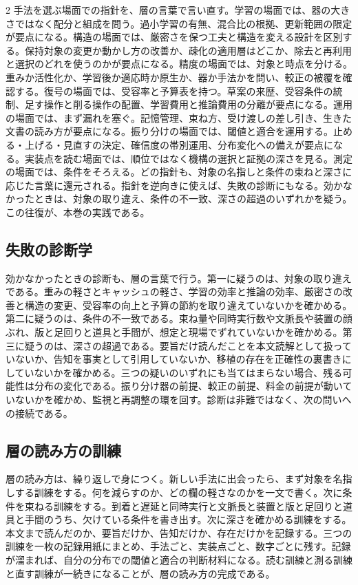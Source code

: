 \documentclass[lualatex,a4paper,10pt]{jlreq}
\begin{document}
\begin{multicols}{2}
手法を選ぶ場面での指針を、層の言葉で言い直す。学習の場面では、器の大きさではなく配分と組成を問う。過小学習の有無、混合比の根拠、更新範囲の限定が要点になる。構造の場面では、厳密さを保つ工夫と構造を変える設計を区別する。保持対象の変更か動かし方の改善か、疎化の適用層はどこか、除去と再利用と選択のどれを使うのかが要点になる。精度の場面では、対象と時点を分ける。重みか活性化か、学習後か適応時か原生か、器か手法かを問い、較正の被覆を確認する。復号の場面では、受容率と予算表を持つ。草案の来歴、受容条件の統制、足す操作と削る操作の配置、学習費用と推論費用の分離が要点になる。運用の場面では、まず漏れを塞ぐ。記憶管理、束ね方、受け渡しの差し引き、生きた文書の読み方が要点になる。振り分けの場面では、閾値と適合を運用する。止める・上げる・見直すの決定、確信度の帯別運用、分布変化への備えが要点になる。実装点を読む場面では、順位ではなく機構の選択と証拠の深さを見る。測定の場面では、条件をそろえる。どの指針も、対象の名指しと条件の束ねと深さに応じた言葉に還元される。指針を逆向きに使えば、失敗の診断にもなる。効かなかったときは、対象の取り違え、条件の不一致、深さの超過のいずれかを疑う。この往復が、本巻の実践である。

\subsection{失敗の診断学}
効かなかったときの診断も、層の言葉で行う。第一に疑うのは、対象の取り違えである。重みの軽さとキャッシュの軽さ、学習の効率と推論の効率、厳密さの改善と構造の変更、受容率の向上と予算の節約を取り違えていないかを確かめる。第二に疑うのは、条件の不一致である。束ね量や同時実行数や文脈長や装置の顔ぶれ、版と足回りと道具と手間が、想定と現場でずれていないかを確かめる。第三に疑うのは、深さの超過である。要旨だけ読んだことを本文読解として扱っていないか、告知を事実として引用していないか、移植の存在を正確性の裏書きにしていないかを確かめる。三つの疑いのいずれにも当てはまらない場合、残る可能性は分布の変化である。振り分け器の前提、較正の前提、料金の前提が動いていないかを確かめ、監視と再調整の環を回す。診断は非難ではなく、次の問いへの接続である。

\subsection{層の読み方の訓練}
層の読み方は、繰り返しで身につく。新しい手法に出会ったら、まず対象を名指しする訓練をする。何を減らすのか、どの欄の軽さなのかを一文で書く。次に条件を束ねる訓練をする。到着と遅延と同時実行と文脈長と装置と版と足回りと道具と手間のうち、欠けている条件を書き出す。次に深さを確かめる訓練をする。本文まで読んだのか、要旨だけか、告知だけか、存在だけかを記録する。三つの訓練を一枚の記録用紙にまとめ、手法ごと、実装点ごと、数字ごとに残す。記録が溜まれば、自分の分布での閾値と適合の判断材料になる。読む訓練と測る訓練と直す訓練が一続きになることが、層の読み方の完成である。


\end{multicols}
\end{document}
